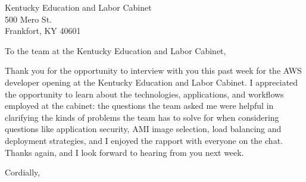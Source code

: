 \documentclass[]{letter}
\newcommand{\companyname}{Kentucky Education and Labor Cabinet}
\newcommand{\companynameshort}{the cabinet}
\newcommand{\position}{AWS developer}
\newcommand{\companystreetaddress}{500 Mero St.}
\newcommand{\city}{Frankfort}
\newcommand{\stateshort}{KY}
\newcommand{\zipcode}{40601}
\begin{document}

\begin{letter}{
		\companyname{} \\
		\companystreetaddress{} \\
		\city{}, \stateshort{} \zipcode{}
	}
\address{
	8404 Glaser Ln. \\
	Louisville, KY 40291
}

\opening{To the team at the \companyname{},}

Thank you for the opportunity to interview with you this past week for the \position{} opening at the \companyname{}. I appreciated the opportunity to learn about the technologies, applications, and workflows employed at \companynameshort{}: the questions the team asked me were helpful in clarifying the kinds of problems the team has to solve for when considering questions like application security, AMI image selection, load balancing and deployment strategies, and I enjoyed the rapport with everyone on the chat. Thanks again, and I look forward to hearing from you next week.


\closing{Cordially,\\
	 \\
}


\end{letter}
\end{document}

